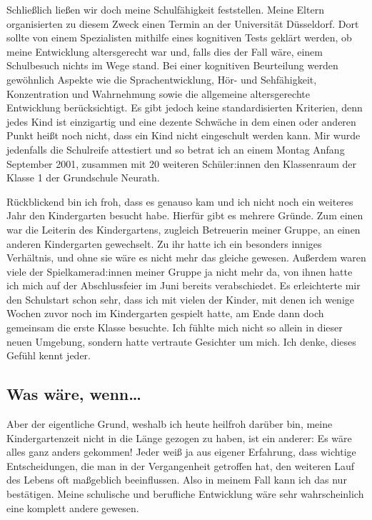 \documentclass[fontsize=14pt,a4paper,headinclude,DIV=calc,automark]{scrbook}
\begin{document}
Schließlich ließen wir doch meine Schulfähigkeit feststellen. Meine Eltern organisierten zu diesem Zweck einen Termin an der Universität Düsseldorf. Dort sollte von einem Spezialisten mithilfe eines kognitiven Tests geklärt werden, ob meine Entwicklung altersgerecht war und, falls dies der Fall wäre, einem Schulbesuch nichts im Wege stand. Bei einer kognitiven Beurteilung werden gewöhnlich Aspekte wie die Sprachentwicklung, Hör- und Sehfähigkeit, Konzentration und Wahrnehmung sowie die allgemeine altersgerechte Entwicklung berücksichtigt. Es gibt jedoch keine standardisierten Kriterien, denn jedes Kind ist einzigartig und eine dezente Schwäche in dem einen oder anderen Punkt heißt noch nicht, dass ein Kind nicht eingeschult werden kann. Mir wurde jedenfalls die Schulreife attestiert und so betrat ich an einem Montag Anfang September 2001, zusammen mit 20 weiteren Schüler:innen den Klassenraum der Klasse 1 der Grundschule Neurath.

Rückblickend bin ich froh, dass es genauso kam und ich nicht noch ein weiteres Jahr den Kindergarten besucht habe. Hierfür gibt es mehrere Gründe. Zum einen war die Leiterin des Kindergartens, zugleich Betreuerin meiner Gruppe, an einen anderen Kindergarten gewechselt. Zu ihr hatte ich ein besonders inniges Verhältnis, und ohne sie wäre es nicht mehr das gleiche gewesen. Außerdem waren viele der Spielkamerad:innen meiner Gruppe ja nicht mehr da, von ihnen hatte ich mich auf der Abschlussfeier im Juni bereits verabschiedet. Es erleichterte mir den Schulstart schon sehr, dass ich mit vielen der Kinder, mit denen ich wenige Wochen zuvor noch im Kindergarten gespielt hatte, am Ende dann doch gemeinsam die erste Klasse besuchte. Ich fühlte mich nicht so allein in dieser neuen Umgebung, sondern hatte vertraute Gesichter um mich. Ich denke, dieses Gefühl kennt jeder.

\subsection{Was wäre, wenn…}

Aber der eigentliche Grund, weshalb ich heute heilfroh darüber bin, meine Kindergartenzeit nicht in die Länge gezogen zu haben, ist ein anderer: Es wäre alles ganz anders gekommen! Jeder weiß ja aus eigener Erfahrung, dass wichtige Entscheidungen, die man in der Vergangenheit getroffen hat, den weiteren Lauf des Lebens oft maßgeblich beeinflussen. Also in meinem Fall kann ich das nur bestätigen. Meine schulische und berufliche Entwicklung wäre sehr wahrscheinlich eine komplett andere gewesen.
\end{document}
